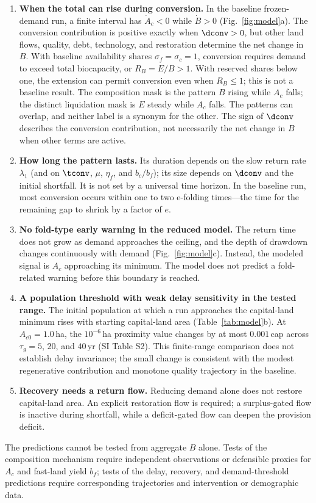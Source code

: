 \begin{enumerate}[label=P\arabic*.,leftmargin=2.2em]
\item \textbf{When the total can rise during conversion.} In the baseline frozen-demand run, a finite interval has $\dot A_c<0$ while $\dot B>0$ (Fig.~\ref{fig:model}a). The conversion contribution is positive exactly when $\dconv>0$, but other land flows, quality, debt, technology, and restoration determine the net change in $B$. With baseline availability shares $\sigma_f=\sigma_c=1$, conversion requires demand to exceed total biocapacity, or $R_B=E/B>1$. With reserved shares below one, the extension can permit conversion even when $R_B\le1$; this is not a baseline result. The composition mask is the pattern $B$ rising while $A_c$ falls; the distinct liquidation mask is $E$ steady while $A_c$ falls. The patterns can overlap, and neither label is a synonym for the other. The sign of $\dconv$ describes the conversion contribution, not necessarily the net change in $B$ when other terms are active.
\item \textbf{How long the pattern lasts.} Its duration depends on the slow return rate $\lambda_1$ (and on $\tconv$, $\mu$, $\eta_f$, and $b_c/b_f$); its size depends on $\dconv$ and the initial shortfall. It is not set by a universal time horizon. In the baseline run, most conversion occurs within one to two e-folding times—the time for the remaining gap to shrink by a factor of $e$.
\item \textbf{No fold-type early warning in the reduced model.} The return time does not grow as demand approaches the ceiling, and the depth of drawdown changes continuously with demand (Fig.~\ref{fig:model}c). Instead, the modeled signal is $A_c$ approaching its minimum. The model does not predict a fold-related warning before this boundary is reached.
\item \textbf{A population threshold with weak delay sensitivity in the tested range.} The initial population at which a run approaches the capital-land minimum rises with starting capital-land area (Table~\ref{tab:model}b). At $A_{c0}=1.0$\,ha, the $10^{-6}$\,ha proximity value changes by at most $0.001$\,cap across $\tau_g=5$, $20$, and $40$\,yr (SI Table S2). This finite-range comparison does not establish delay invariance; the small change is consistent with the modest regenerative contribution and monotone quality trajectory in the baseline.
\item \textbf{Recovery needs a return flow.} Reducing demand alone does not restore capital-land area. An explicit restoration flow is required; a surplus-gated flow is inactive during shortfall, while a deficit-gated flow can deepen the provision deficit.
\end{enumerate}
The predictions cannot be tested from aggregate $B$ alone. Tests of the composition mechanism require independent observations or defensible proxies for $A_c$ and fast-land yield $b_f$; tests of the delay, recovery, and demand-threshold predictions require corresponding trajectories and intervention or demographic data.
